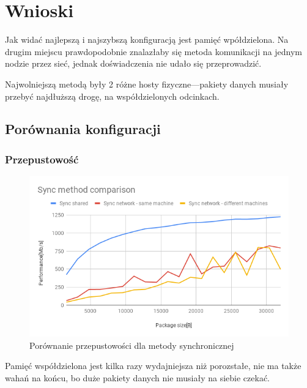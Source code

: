 \documentclass[11pt]{article}
\begin{document}
    \section{Wnioski}
    Jak widać najlepszą i najszybszą konfiguracją jest pamięć wpółdzielona.
    Na drugim miejscu prawdopodobnie znalazłaby się metoda komunikacji na jednym nodzie przez sieć, jednak
    doświadczenia nie udało się przeprowadzić.

    Najwolniejszą metodą były 2 różne hosty fizyczne---pakiety danych musiały przebyć najdłuższą drogę, na
    współdzielonych odcinkach.

    \subsection{Porównania konfiguracji}
    \subsubsection{Przepustowość}
    \begin{figure}[H]
        \includegraphics[width=1\textwidth,frame]{charts/Sync method comparison.png}
        \caption{Porównanie przepustowości dla metody synchronicznej}
        \label{fig:sync-comparison}
    \end{figure}

    Pamięć współdzielona jest kilka razy wydajniejsza niż porozstałe, nie ma także wahań na końcu, bo duże pakiety
    danych nie musiały na siebie czekać.
\end{document}
